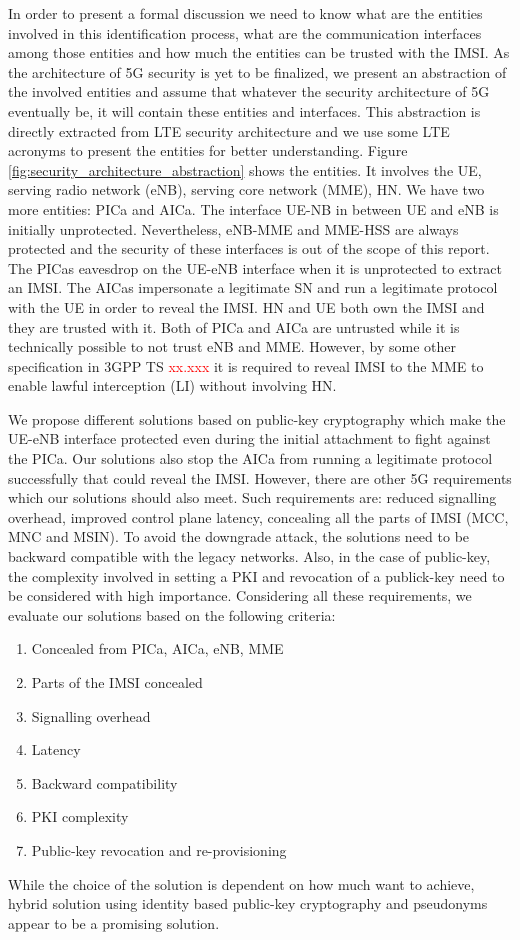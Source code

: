 \documentclass[lnicst,sechang,a4paper]{svmultln}
\begin{document}
In order to present a formal discussion we need to know what are the entities involved in this identification process, what are the communication interfaces among those entities and how much the entities can be trusted with the IMSI.  As the architecture of 5G security is yet to be finalized, we present an abstraction of the involved entities and assume that whatever the security architecture of 5G eventually be, it will contain these entities and interfaces. This abstraction is directly extracted from LTE security architecture and we use some LTE acronyms to present the entities for better understanding. Figure \ref{fig:security_architecture_abstraction} shows the entities. It involves the UE, serving radio network (eNB), serving core network (MME), HN. We have two more entities: PICa and AICa. The interface  UE-NB in between UE and eNB is initially unprotected. Nevertheless, eNB-MME and MME-HSS are always protected and the security of these interfaces is out of the scope of this report. The PICas eavesdrop on the UE-eNB interface when it is unprotected to extract an IMSI. The AICas impersonate a legitimate SN and run a legitimate protocol with the UE in order to reveal the IMSI. HN and UE both own the IMSI and they are trusted with it. Both of PICa and AICa are untrusted while it is technically possible to not trust eNB and MME. However, by some other specification in 3GPP TS \textcolor{red}{xx.xxx} it is required to reveal IMSI to the MME to enable lawful interception (LI) without involving HN. 

We propose different solutions based on public-key cryptography which make the UE-eNB interface protected even during the initial attachment to fight against the PICa. Our solutions also stop the AICa from running a legitimate protocol successfully that could reveal the IMSI. However, there are other 5G requirements which our solutions should also meet. Such requirements are: reduced signalling overhead, improved control plane latency, concealing all the parts of IMSI (MCC, MNC and MSIN). To avoid the downgrade attack, the solutions need to be backward compatible with the legacy networks. Also, in the case of public-key, the complexity involved in setting a PKI and revocation of a publick-key need to be considered with high importance. Considering all these requirements, we evaluate our solutions based on the following criteria:
\begin{enumerate}
\item Concealed from PICa, AICa, eNB, MME
\item Parts of the IMSI concealed
\item Signalling overhead
\item Latency
\item Backward compatibility
\item PKI complexity
\item Public-key revocation and re-provisioning 
\end{enumerate}
While the choice of the solution is dependent on how much want to achieve, hybrid solution using identity based public-key cryptography and pseudonyms appear to be a promising solution.
\end{document}
